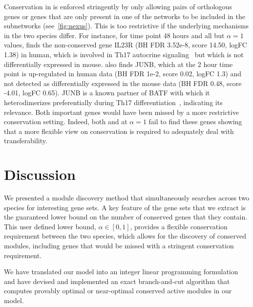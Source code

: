 Conservation in \nexus{} is enforced stringently by only allowing pairs of orthologous genes or genes that are only present in one of the networks to be included in the subnetworks (see~\cref{fig:nexus}).
This is too restrictive if the underlying mechanisms in the two species differ.
For instance, for time point 48 hours and all but $\alpha=1$ values, \xheinz{} finds the non-conserved gene IL23R (BH FDR 3.52e-8, score 14.50, logFC 1.38) in human, which is involved in Th17 autocrine signaling~\parencite{wei200721} but which is not differentially expressed in mouse.
\xheinz{} also finds JUNB, which at the 2 hour time point is up-regulated in human data (BH FDR 1e-2, score 0.02, logFC 1.3) and not detected as differentially expressed in the mouse data (BH FDR 0.48, score -4.01, logFC 0.65).
JUNB is a known partner of BATF with which it heterodimerizes preferentially during Th17 differentiation~\parencite{schraml2009ap}, indicating its relevance.
Both important genes would have been missed by a more restrictive conservation setting.
Indeed, both \nexus{} and \xheinz{} at $\alpha = 1$ fail to find these genes showing that a more flexible view on conservation is required to adequately deal with transferability.

\section{Discussion}
\label{sec:xdisc}

We presented a module discovery method that simultaneously searches across two species for interesting gene sets.
A key feature of the gene sets that we extract is the guaranteed lower bound on the number of conserved genes that they contain.
This user defined lower bound, $\alpha \in [0, 1]$, provides a flexible conservation requirement between the two species, which allows for the discovery of conserved modules, including genes that would be missed with a stringent conservation requirement.%

We have translated our model into an integer linear programming formulation and have devised and implemented an exact branch-and-cut algorithm that computes provably optimal or near-optimal conserved active modules in our model.

